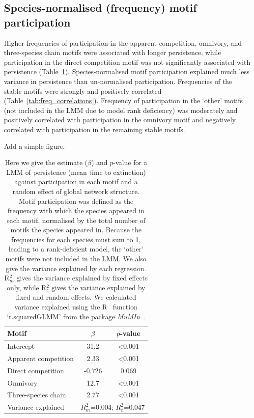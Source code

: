 \documentclass[12pt]{article}
\begin{document}
\begin{spacing}{2.0}
	\subsection*{Species-normalised (frequency) motif participation}


		Higher frequencies of participation in the apparent competition, omnivory, and three-species chain motifs were associated with longer persistence, while participation in the direct competition motif was not significantly associated with persistence (Table~\ref{tab:persistence_freq}).
		Species-normalised motif participation explained much less variance in persistence than un-normalised participation.
		Frequencies of the stable motifs were strongly and positively correlated (Table~\ref{tab:freq_correlations}).
		Frequency of participation in the `other' motifs (not included in the LMM due to model rank deficiency) was moderately and positively correlated with participation in the omnivory motif and negatively correlated with participation in the remaining stable motifs.


		Add a simple figure.


		\begin{table}[h!]
		\caption{Here we give the estimate ($\beta$) and $p$-value for a LMM of persistence (mean time to extinction) against participation in each motif and a random effect of global network structure. Motif participation was defined as the frequency with which the species appeared in each motif, normalised by the total number of motifs the species appeared in. Because the frequencies for each species must sum to 1, leading to a rank-deficient model, the `other' motifs were not included in the LMM. We also give the variance explained by each regression. R$^{2}_{m}$ gives the variance explained by fixed effects only, while R$^{2}_{c}$ gives the variance explained by fixed and random effects. We calculated variance explained using the R~\citep{R} function `r.squaredGLMM' from the package \emph{MuMIn}~\citep{MuMIn}.}
		\label{tab:persistence_freq}
		\begin{tabular}{l | c c}
		 Motif & $\beta$ & $p$-value \\  
		 \hline
		 Intercept & 31.2 & \textless0.001 \\
		 \hline
		 Apparent competition & 2.33 & \textless0.001 \\
		 Direct competition & -0.726 & 0.069 \\
		 Omnivory & 12.7 & \textless0.001 \\
		 Three-species chain & 2.77 & \textless0.001 \\
		 \hline
		 Variance explained & \multicolumn{2}{c}{$R^{2}_m$=0.004; $R^{2}_c$=0.047} \\
		 \hline
		 \end{tabular}
		 \end{table}



\end{spacing}
\end{document}
